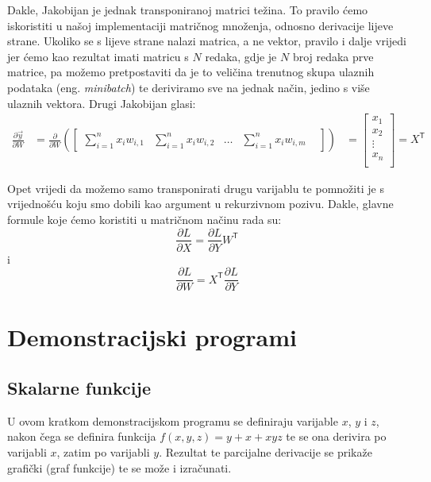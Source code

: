 \documentclass[zavrsnirad]{fer}
\begin{document}
Dakle, Jakobijan je jednak transponiranoj matrici težina. To pravilo ćemo iskoristiti u našoj implementaciji matričnog množenja, odnosno derivacije lijeve strane. Ukoliko se s lijeve strane nalazi matrica, a ne vektor, pravilo i dalje vrijedi jer ćemo kao rezultat imati matricu s $N$ redaka, gdje je $N$ broj redaka prve matrice, pa možemo pretpostaviti da je to veličina trenutnog skupa ulaznih podataka (eng. \textit{minibatch}) te deriviramo sve na jednak način, jedino s više ulaznih vektora. Drugi Jakobijan glasi:
\begin{align*}
  \frac{\partial \vec{y}}{\partial W} &=
  \frac{\partial}{\partial W}
  \left(
    \begin{bmatrix}
      \sum_{i=1}^{n} x_i w_{i,1} &
      \sum_{i=1}^{n} x_i w_{i,2} &
      \dots &
      \sum_{i=1}^{n} x_i w_{i,m} &
    \end{bmatrix}
  \right)
  &=
  \begin{bmatrix}
    x_1 \\
    x_2 \\
    \vdots \\
    x_n \\
  \end{bmatrix}
  = X^\mathsf{T}
\end{align*}

 Opet vrijedi da možemo samo transponirati drugu varijablu te pomnožiti je s vrijednošću koju smo dobili kao argument u rekurzivnom pozivu. Dakle, glavne formule koje ćemo koristiti u matričnom načinu rada su:
\begin{equation}
  \frac{\partial L}{\partial X} = \frac{\partial L}{\partial Y} W^\mathsf{T}
\end{equation}
 i
\begin{equation}
  \frac{\partial L}{\partial W} = X^\mathsf{T} \frac{\partial L}{\partial Y}
\end{equation}

\pagebreak
\section{Demonstracijski programi}
\subsection{Skalarne funkcije}
U ovom kratkom demonstracijskom programu se definiraju varijable $x$, $y$ i $z$, nakon čega se definira funkcija $f(x, y, z) = y + x + xyz$ te se ona derivira po varijabli $x$, zatim po varijabli $y$. Rezultat te parcijalne derivacije se prikaže grafički (graf funkcije) te se može i izračunati.
\end{document}
